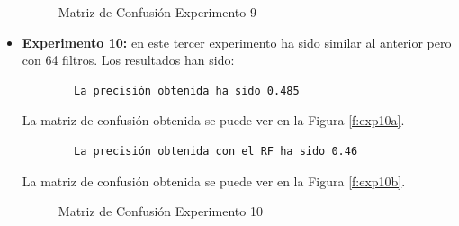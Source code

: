 \begin{itemize}
\begin{figure}[h]
     \centering
     \caption{Matriz de Confusión Experimento 9}
     \label{f:exp9}
    \end{figure}
    
    \item \textbf{Experimento 10:} en este tercer experimento ha sido similar al anterior pero con 64 filtros. Los resultados han sido:
    \begin{verbatim}
        La precisión obtenida ha sido 0.485
    \end{verbatim}
    La matriz de confusión obtenida se puede ver en la Figura \ref{f:exp10a}.
    \begin{verbatim}
        La precisión obtenida con el RF ha sido 0.46
    \end{verbatim}
    La matriz de confusión obtenida se puede ver en la Figura \ref{f:exp10b}.
    \begin{figure}[h]
     \centering
     \caption{Matriz de Confusión Experimento 10}
     \label{f:exp10}
    \end{figure}
    

\end{itemize}

